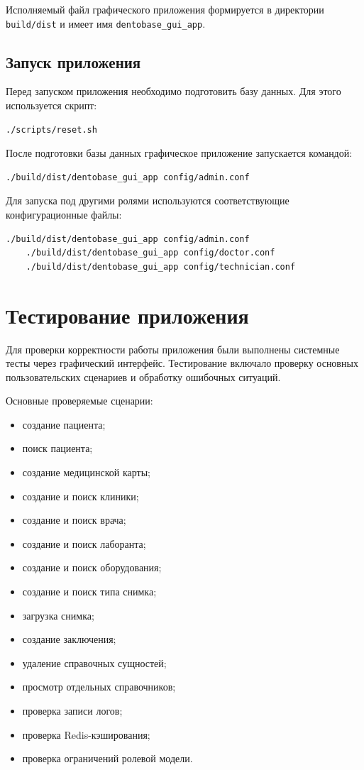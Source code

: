Исполняемый файл графического приложения формируется в директории \texttt{build/dist} и имеет имя \texttt{dentobase\_gui\_app}.

\subsection{Запуск приложения}

Перед запуском приложения необходимо подготовить базу данных. Для этого используется скрипт:

\begin{lstlisting}[caption={Подготовка базы данных}]
	./scripts/reset.sh
\end{lstlisting}

После подготовки базы данных графическое приложение запускается командой:

\begin{lstlisting}[caption={Запуск графического приложения}]
	./build/dist/dentobase_gui_app config/admin.conf
\end{lstlisting}

Для запуска под другими ролями используются соответствующие конфигурационные файлы:

\begin{lstlisting}[caption={Запуск приложения под разными ролями}]
	./build/dist/dentobase_gui_app config/admin.conf
	./build/dist/dentobase_gui_app config/doctor.conf
	./build/dist/dentobase_gui_app config/technician.conf
\end{lstlisting}

\section{Тестирование приложения}

Для проверки корректности работы приложения были выполнены системные тесты через графический интерфейс. Тестирование включало проверку основных пользовательских сценариев и обработку ошибочных ситуаций.

Основные проверяемые сценарии:

\begin{itemize}
	\item создание пациента;
	\item поиск пациента;
	\item создание медицинской карты;
	\item создание и поиск клиники;
	\item создание и поиск врача;
	\item создание и поиск лаборанта;
	\item создание и поиск оборудования;
	\item создание и поиск типа снимка;
	\item загрузка снимка;
	\item создание заключения;
	\item удаление справочных сущностей;
	\item просмотр отдельных справочников;
	\item проверка записи логов;
	\item проверка Redis-кэширования;
	\item проверка ограничений ролевой модели.
\end{itemize}

